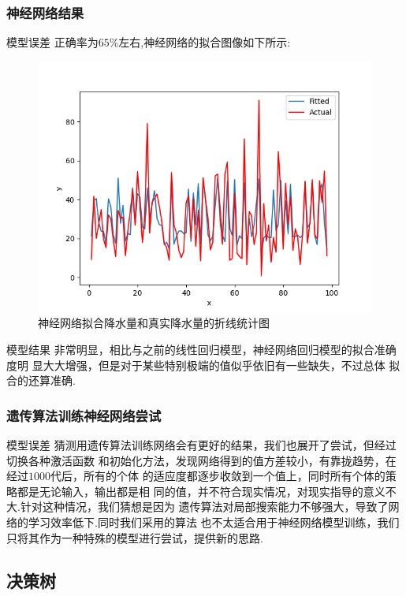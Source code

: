 \documentclass[10pt]{beamer}
\begin{document}
\begin{frame}
	\frametitle{神经网络结果}
	\begin{block}{模型误差}
		正确率为$65\%$左右,神经网络的拟合图像如下所示:
		\begin{figure}[h!]
			\centering
			\includegraphics[scale=0.3]{../latex/success.png}
			\caption{神经网络拟合降水量和真实降水量的折线统计图}
		\end{figure}
	\end{block}
	\begin{block}{模型结果}
		非常明显，相比与之前的线性回归模型，神经网络回归模型的拟合准确度明
		显大大增强，但是对于某些特别极端的值似乎依旧有一些缺失，不过总体
		拟合的还算准确.
	\end{block}
\end{frame}

\begin{frame}
	\frametitle{遗传算法训练神经网络尝试}
	\begin{block}{模型误差}
		猜测用遗传算法训练网络会有更好的结果，我们也展开了尝试，但经过切换各种激活函数
		和初始化方法，发现网络得到的值方差较小，有靠拢趋势，在经过$1000$代后，所有的个体
		的适应度都逐步收敛到一个值上，同时所有个体的策略都是无论输入，输出都是相
		同的值，并不符合现实情况，对现实指导的意义不大.针对这种情况，我们猜想是因为
		遗传算法对局部搜索能力不够强大，导致了网络的学习效率低下.同时我们采用的算法
		也不太适合用于神经网络模型训练，我们只将其作为一种特殊的模型进行尝试，提供新的思路.
	\end{block}
\end{frame}

\subsection{决策树}
\end{document}
